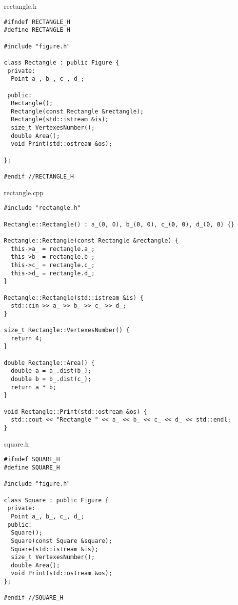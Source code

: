 \documentclass[12pt]{article}
\begin{document}
\begin{flushleft}
{\Huge rectangle.h}
\begin{verbatim}
#ifndef RECTANGLE_H
#define RECTANGLE_H

#include "figure.h"

class Rectangle : public Figure {
 private:
  Point a_, b_, c_, d_;

 public:
  Rectangle();
  Rectangle(const Rectangle &rectangle);
  Rectangle(std::istream &is);
  size_t VertexesNumber();
  double Area();
  void Print(std::ostream &os);

};

#endif //RECTANGLE_H
\end{verbatim}
\end{flushleft}
    \pagebreak

\begin{flushleft}
{\Huge rectangle.cpp}
\begin{verbatim}
#include "rectangle.h"

Rectangle::Rectangle() : a_(0, 0), b_(0, 0), c_(0, 0), d_(0, 0) {}

Rectangle::Rectangle(const Rectangle &rectangle) {
  this->a_ = rectangle.a_;
  this->b_ = rectangle.b_;
  this->c_ = rectangle.c_;
  this->d_ = rectangle.d_;
}

Rectangle::Rectangle(std::istream &is) {
  std::cin >> a_ >> b_ >> c_ >> d_;
}

size_t Rectangle::VertexesNumber() {
  return 4;
}

double Rectangle::Area() {
  double a = a_.dist(b_);
  double b = b_.dist(c_);
  return a * b;
}

void Rectangle::Print(std::ostream &os) {
  std::cout << "Rectangle " << a_ << b_ << c_ << d_ << std::endl;
}
\end{verbatim}
\end{flushleft}
    \pagebreak

\begin{flushleft}
{\Huge square.h}
\begin{verbatim}
#ifndef SQUARE_H
#define SQUARE_H

#include "figure.h"

class Square : public Figure {
 private:
  Point a_, b_, c_, d_;
 public:
  Square();
  Square(const Square &square);
  Square(std::istream &is);
  size_t VertexesNumber();
  double Area();
  void Print(std::ostream &os);
};

#endif //SQUARE_H
\end{verbatim}
\end{flushleft}
    \pagebreak
\end{document}
